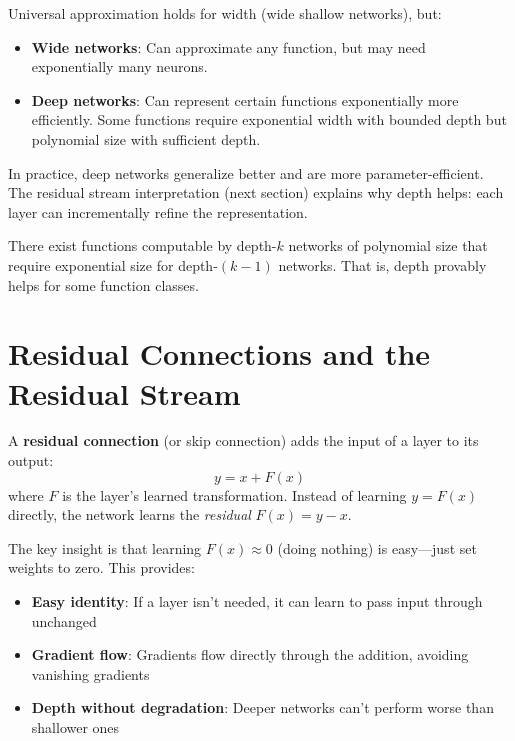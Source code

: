 \begin{remark}
    Universal approximation holds for width (wide shallow networks), but:
    \begin{itemize}
        \item \textbf{Wide networks}: Can approximate any function, but may need exponentially many neurons.
        \item \textbf{Deep networks}: Can represent certain functions exponentially more efficiently. Some functions require exponential width with bounded depth but polynomial size with sufficient depth.
    \end{itemize}

    In practice, deep networks generalize better and are more parameter-efficient. The residual stream interpretation (next section) explains why depth helps: each layer can incrementally refine the representation.
\end{remark}

\begin{theorem}
    There exist functions computable by depth-$k$ networks of polynomial size that require exponential size for depth-$(k-1)$ networks. That is, depth provably helps for some function classes.
\end{theorem}

\section{Residual Connections and the Residual Stream}

\begin{definition}
    A \textbf{residual connection} (or skip connection) adds the input of a layer to its output:
    \[
        y = x + F(x)
    \]
    where $F$ is the layer's learned transformation. Instead of learning $y = F(x)$ directly, the network learns the \emph{residual} $F(x) = y - x$.
\end{definition}

\begin{remark}
    The key insight is that learning $F(x) \approx 0$ (doing nothing) is easy---just set weights to zero. This provides:
    \begin{itemize}
        \item \textbf{Easy identity}: If a layer isn't needed, it can learn to pass input through unchanged
        \item \textbf{Gradient flow}: Gradients flow directly through the addition, avoiding vanishing gradients
        \item \textbf{Depth without degradation}: Deeper networks can't perform worse than shallower ones
    \end{itemize}
\end{remark}

